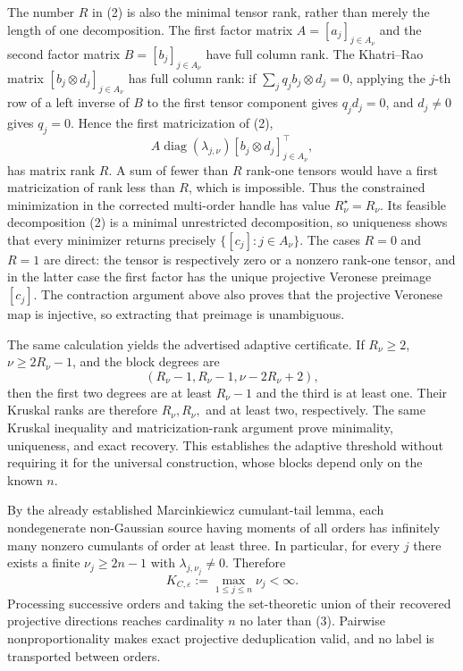 The number \(R\) in (2) is also the minimal tensor rank, rather than merely the length of one decomposition. The first factor matrix \(A=[a_j]_{j\in A_\nu}\) and the second factor matrix \(B=[b_j]_{j\in A_\nu}\) have full column rank. The Khatri--Rao matrix \([b_j\otimes d_j]_{j\in A_\nu}\) has full column rank: if \(\sum_j q_j b_j\otimes d_j=0\), applying the \(j\)-th row of a left inverse of \(B\) to the first tensor component gives \(q_jd_j=0\), and \(d_j\ne0\) gives \(q_j=0\). Hence the first matricization of (2),
\[
 A\operatorname{diag}(\lambda_{j,\nu})
 [b_j\otimes d_j]_{j\in A_\nu}^{\top},
\]
has matrix rank \(R\). A sum of fewer than \(R\) rank-one tensors would have a first matricization of rank less than \(R\), which is impossible. Thus the constrained minimization in the corrected multi-order handle has value \(R_\nu^\star=R_\nu\). Its feasible decomposition (2) is a minimal unrestricted decomposition, so uniqueness shows that every minimizer returns precisely \(\{[c_j]:j\in A_\nu\}\). The cases \(R=0\) and \(R=1\) are direct: the tensor is respectively zero or a nonzero rank-one tensor, and in the latter case the first factor has the unique projective Veronese preimage \([c_j]\). The contraction argument above also proves that the projective Veronese map is injective, so extracting that preimage is unambiguous.

The same calculation yields the advertised adaptive certificate. If \(R_\nu\ge2\), \(\nu\ge2R_\nu-1\), and the block degrees are
\[
 (R_\nu-1,R_\nu-1,\nu-2R_\nu+2),
\]
then the first two degrees are at least \(R_\nu-1\) and the third is at least one. Their Kruskal ranks are therefore \(R_\nu,R_\nu,\) and at least two, respectively. The same Kruskal inequality and matricization-rank argument prove minimality, uniqueness, and exact recovery. This establishes the adaptive threshold without requiring it for the universal construction, whose blocks depend only on the known \(n\).

By the already established Marcinkiewicz cumulant-tail lemma, each nondegenerate non-Gaussian source having moments of all orders has infinitely many nonzero cumulants of order at least three. In particular, for every \(j\) there exists a finite \(\nu_j\ge2n-1\) with \(\lambda_{j,\nu_j}\ne0\). Therefore
\[
 K_{C,\varepsilon}:=\max_{1\le j\le n}\nu_j<\infty.
 \tag{3}
\]
Processing successive orders and taking the set-theoretic union of their recovered projective directions reaches cardinality \(n\) no later than (3). Pairwise nonproportionality makes exact projective deduplication valid, and no label is transported between orders.

